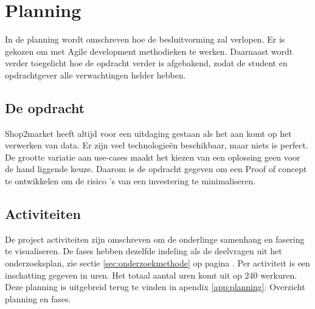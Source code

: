 \chapter{Planning} %

In de planning wordt omschreven hoe de besluitvorming zal verlopen. Er is gekozen om met Agile development methodieken te werken. Daarnaast wordt verder toegelicht hoe de opdracht verder is afgebakend, zodat de student en opdrachtgever alle verwachtingen helder hebben. 

\section{De opdracht} %

Shop2market heeft altijd voor een uitdaging gestaan als het aan komt op het verwerken van data. Er zijn veel technologieën beschikbaar, maar niets is perfect. De grootte variatie aan use-cases maakt het kiezen van een oplossing geen voor de hand liggende keuze.
Daarom is de opdracht gegeven om een Proof of concept te ontwikkelen om de risico 's van een investering te minimaliseren.


\section{Activiteiten}
\label{sec:activiteiten}
De project activiteiten zijn omschreven om de onderlinge samenhang en fasering te visualiseren. De fases hebben dezelfde indeling als de deelvragen uit het onderzoeksplan, zie sectie \ref{sec:onderzoekmethode} op pagina \pageref{sec:onderzoekmethode}. Per activiteit is een inschatting gegeven in uren. Het totaal aantal uren komt uit op 240 werkuren. Deze planning is uitgebreid terug te vinden in apendix \ref{app:planning}: Overzicht planning en fases.


